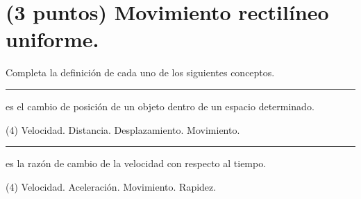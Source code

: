 \documentclass[12pt, letter]{exam}
\begin{document}
\begin{questions}
\begin{tasks}
    \end{tasks}

    \section{(3 puntos) Movimiento rectilíneo uniforme.}

    Completa la definición de cada uno de los siguientes conceptos.
    \question \rule{2cm}{0.1mm} es el cambio de posición de un objeto dentro de un espacio determinado.
    \begin{tasks}(4)
        \task Velocidad.
        \task Distancia.
        \task Desplazamiento.
        \task Movimiento.
    \end{tasks}
    \question \rule{1.5cm}{0.1mm} es la razón de cambio de la velocidad con respecto al tiempo.
    \begin{tasks}(4)
        \task Velocidad.
        \task Aceleración.
        \task Movimiento.
        \task Rapidez.
    \end{tasks}


\end{questions}
\end{document}
